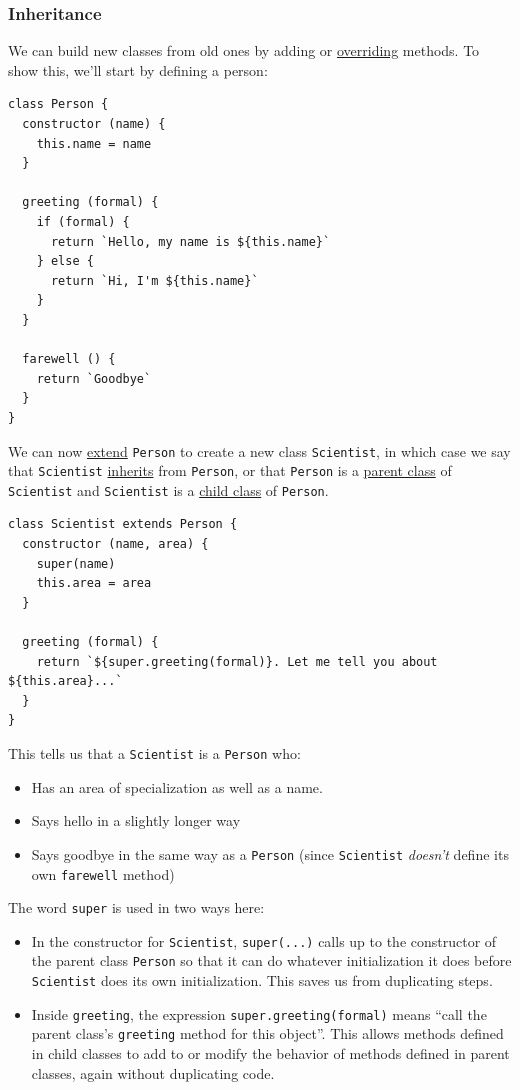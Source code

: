 \subsubsection{Inheritance}\label{s:oop-inheritance}

We can build new classes from old ones by adding or
\protect\hyperlink{g:override-method}{overriding} methods. To show this,
we'll start by defining a person:

\begin{verbatim}
class Person {
  constructor (name) {
    this.name = name
  }

  greeting (formal) {
    if (formal) {
      return `Hello, my name is ${this.name}`
    } else {
      return `Hi, I'm ${this.name}`
    }
  }

  farewell () {
    return `Goodbye`
  }
}
\end{verbatim}

We can now \protect\hyperlink{g:extend}{extend} \texttt{Person} to
create a new class \texttt{Scientist}, in which case we say that
\texttt{Scientist} \protect\hyperlink{g:inherit}{inherits} from
\texttt{Person}, or that \texttt{Person} is a
\protect\hyperlink{g:parent-class}{parent class} of \texttt{Scientist}
and \texttt{Scientist} is a \protect\hyperlink{g:child-class}{child
class} of \texttt{Person}.

\begin{verbatim}
class Scientist extends Person {
  constructor (name, area) {
    super(name)
    this.area = area
  }

  greeting (formal) {
    return `${super.greeting(formal)}. Let me tell you about ${this.area}...`
  }
}
\end{verbatim}

This tells us that a \texttt{Scientist} is a \texttt{Person} who:

\begin{itemize}
\tightlist
\item
  Has an area of specialization as well as a name.
\item
  Says hello in a slightly longer way
\item
  Says goodbye in the same way as a \texttt{Person} (since
  \texttt{Scientist} \emph{doesn't} define its own \texttt{farewell}
  method)
\end{itemize}

The word \texttt{super} is used in two ways here:

\begin{itemize}
\tightlist
\item
  In the constructor for \texttt{Scientist}, \texttt{super(...)} calls
  up to the constructor of the parent class \texttt{Person} so that it
  can do whatever initialization it does before \texttt{Scientist} does
  its own initialization. This saves us from duplicating steps.
\item
  Inside \texttt{greeting}, the expression
  \texttt{super.greeting(formal)} means ``call the parent class's
  \texttt{greeting} method for this object''. This allows methods
  defined in child classes to add to or modify the behavior of methods
  defined in parent classes, again without duplicating code.
\end{itemize}

